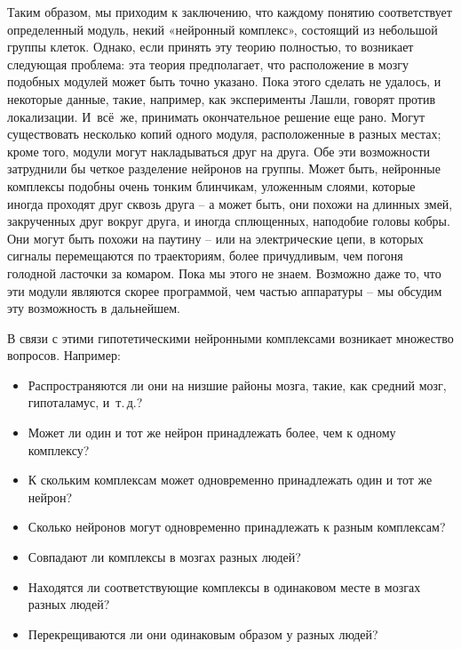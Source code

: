 \documentclass[../main.tex]{subfiles}
\begin{document}
Таким образом, мы приходим к заключению, что каждому понятию соответствует определенный модуль, некий «нейронный комплекс», состоящий из небольшой группы клеток. Однако, если принять эту теорию полностью, то возникает следующая проблема: эта теория предполагает, что расположение в мозгу подобных модулей может быть точно указано. Пока этого сделать не удалось, и некоторые данные, такие, например, как эксперименты Лашли, говорят против локализации. И~всё~же, принимать окончательное решение еще рано. Могут существовать несколько копий одного модуля, расположенные в разных местах; кроме того, модули могут накладываться друг на друга. Обе эти возможности затруднили бы четкое разделение нейронов на группы. Может быть, нейронные комплексы подобны очень тонким блинчикам, уложенным слоями, которые иногда проходят друг сквозь друга \--- а может быть, они похожи на длинных змей, закрученных друг вокруг друга, и иногда сплющенных, наподобие головы кобры. Они могут быть похожи на паутину \--- или на электрические цепи, в которых сигналы перемещаются по траекториям, более причудливым, чем погоня голодной ласточки за комаром. Пока мы этого не знаем. Возможно даже то, что эти модули являются скорее программой, чем частью аппаратуры \--- мы обсудим эту возможность в дальнейшем.

В связи с этими гипотетическими нейронными комплексами возникает множество вопросов. Например:
\begin{itemize}[label={}, noitemsep, topsep=6pt]
    \item[] Распространяются ли они на низшие районы мозга, такие, как средний мозг, гипоталамус, и~т.\,д.?
    \item[] Может ли один и тот же нейрон принадлежать более, чем к одному комплексу?
    \item[] К скольким комплексам может одновременно принадлежать один и тот же нейрон?
    \item[] Сколько нейронов могут одновременно принадлежать к разным комплексам?
    \item[] Совпадают ли комплексы в мозгах разных людей?
    \item[] Находятся ли соответствующие комплексы в одинаковом месте в мозгах разных людей?
    \item[] Перекрещиваются ли они одинаковым образом у разных людей?
\end{itemize}
\end{document}
